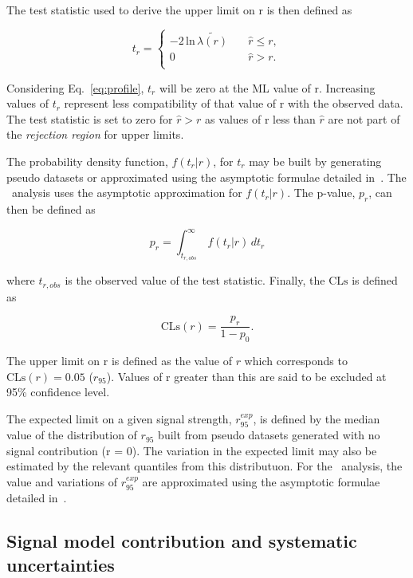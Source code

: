 The test statistic used to derive the upper limit on r is then defined as

\begin{equation}
t_r = 
\begin{cases}
-2\,\text{ln}\,\tilde{\lambda(r)}\quad &\hat{r} \le r, \\ 
0 \quad &\hat{r} > r. \\ 
\end{cases}
\end{equation}

Considering Eq.~\ref{eq:profile}, $t_r$ will be zero at the ML value of r.
Increasing values of $t_r$ represent less compatibility of that value of r with
the observed data. The test statistic is set to zero for $\hat{r} > r$ as
values of r less than $\hat{r}$ are not part of the \emph{rejection region} for upper limits. 

The probability density function, $f(t_r|r)$, for $t_r$ may be built by 
generating pseudo datasets or approximated using the asymptotic formulae 
detailed in~\cite{asymp}. The \alphat~analysis uses the asymptotic
approximation for $f(t_r|r)$. The p-value, $p_r$, can then be defined as

\begin{equation}
p_r = \int_{t_{r,obs}}^{\infty}\, f(t_r|r)\, dt_r
\end{equation}

where ${t_{r,obs}}$ is the observed value of the test statistic. Finally,
the $\text{CLs}$ is defined as

\begin{equation}
\text{CLs}(r) = \frac{p_r}{1-p_0}.
\end{equation}

The upper limit on r is defined as the value of $r$ which corresponds to 
$\text{CLs}(r) = 0.05$ ($r_{95}$). Values of r greater than this are said to be excluded at 95\%
confidence level.

The expected limit on a given signal strength, $r_{95}^{exp}$, is defined by the median value of the distribution
of $r_{95}$ built from pseudo datasets generated with no signal contribution (r = 0). The variation in the 
expected limit may also be estimated by the relevant quantiles from this distributuon.
For the \alphat~analysis, the value and variations of $r_{95}^{exp}$ are approximated using 
the asymptotic formulae detailed in~\cite{asymp}.

\subsection{Signal model contribution and systematic uncertainties}

